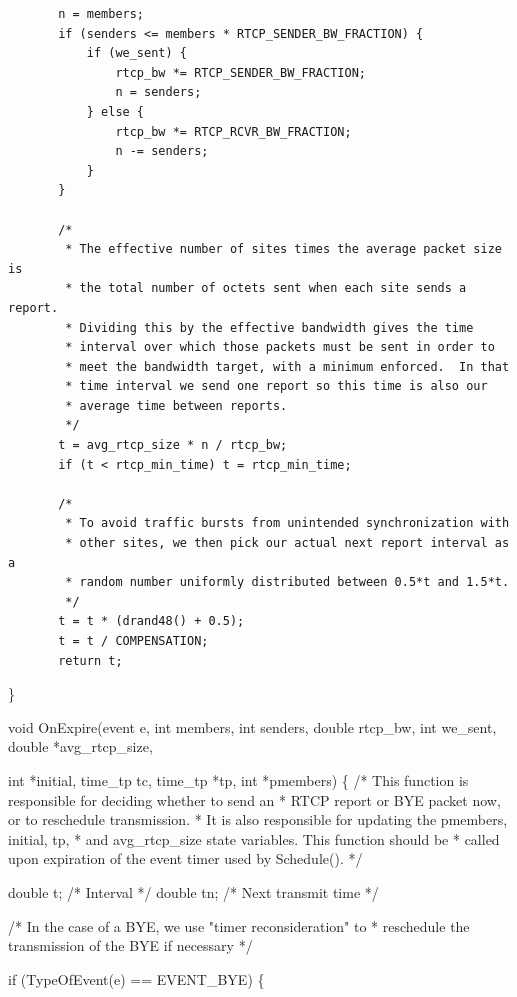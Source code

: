 \documentclass{article}
\begin{document}
\begin{verbatim}
       n = members;
       if (senders <= members * RTCP_SENDER_BW_FRACTION) {
           if (we_sent) {
               rtcp_bw *= RTCP_SENDER_BW_FRACTION;
               n = senders;
           } else {
               rtcp_bw *= RTCP_RCVR_BW_FRACTION;
               n -= senders;
           }
       }

       /*
        * The effective number of sites times the average packet size is
        * the total number of octets sent when each site sends a report.
        * Dividing this by the effective bandwidth gives the time
        * interval over which those packets must be sent in order to
        * meet the bandwidth target, with a minimum enforced.  In that
        * time interval we send one report so this time is also our
        * average time between reports.
        */
       t = avg_rtcp_size * n / rtcp_bw;
       if (t < rtcp_min_time) t = rtcp_min_time;

       /*
        * To avoid traffic bursts from unintended synchronization with
        * other sites, we then pick our actual next report interval as a
        * random number uniformly distributed between 0.5*t and 1.5*t.
        */
       t = t * (drand48() + 0.5);
       t = t / COMPENSATION;
       return t;
\end{verbatim}

\}

void OnExpire(event e, int    members, int    senders, double rtcp\_bw, int    we\_sent, double *avg\_rtcp\_size,

int    *initial, time\_tp   tc, time\_tp   *tp, int    *pmembers) \{ /* This function is responsible for deciding whether to send an * RTCP report or BYE packet now, or to reschedule transmission. * It is also responsible for updating the pmembers, initial, tp, * and avg\_rtcp\_size state variables.  This function should be * called upon expiration of the event timer used by Schedule(). */

double t;     /* Interval */ double tn;    /* Next transmit time */

/* In the case of a BYE, we use "timer reconsideration" to * reschedule the transmission of the BYE if necessary */

if (TypeOfEvent(e) == EVENT\_BYE) \{
\end{document}
